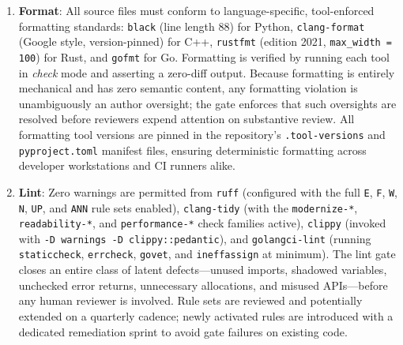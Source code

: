 \documentclass[12pt,openany]{book}
\numberwithin{equation}{chapter}
\theoremstyle{plain}
\theoremstyle{definition}
\theoremstyle{remark}
\begin{document}
\begin{enumerate}
    \item \textbf{Format}: All source files must conform to language-specific,
          tool-enforced formatting standards: \texttt{black} (line length 88) for
          Python, \texttt{clang-format} (Google style, version-pinned) for C++,
          \texttt{rustfmt} (edition 2021, \texttt{max\_width = 100}) for Rust, and
          \texttt{gofmt} for Go. Formatting is verified by running each tool in
          \emph{check} mode and asserting a zero-diff output. Because formatting is
          entirely mechanical and has zero semantic content, any formatting violation
          is unambiguously an author oversight; the gate enforces that such oversights
          are resolved before reviewers expend attention on substantive review. All
          formatting tool versions are pinned in the repository's \texttt{.tool-versions}
          and \texttt{pyproject.toml} manifest files, ensuring deterministic formatting
          across developer workstations and CI runners alike.

    \item \textbf{Lint}: Zero warnings are permitted from \texttt{ruff} (configured
          with the full \texttt{E}, \texttt{F}, \texttt{W}, \texttt{N}, \texttt{UP},
          and \texttt{ANN} rule sets enabled), \texttt{clang-tidy} (with the
          \texttt{modernize-*}, \texttt{readability-*}, and \texttt{performance-*}
          check families active), \texttt{clippy} (invoked with
          \texttt{-D warnings -D clippy::pedantic}), and \texttt{golangci-lint}
          (running \texttt{staticcheck}, \texttt{errcheck}, \texttt{govet}, and
          \texttt{ineffassign} at minimum). The lint gate closes an entire class of
          latent defects—unused imports, shadowed variables, unchecked error returns,
          unnecessary allocations, and misused APIs—before any human reviewer is
          involved. Rule sets are reviewed and potentially extended on a quarterly
          cadence; newly activated rules are introduced with a dedicated remediation
          sprint to avoid gate failures on existing code.


\end{enumerate}
\end{document}
